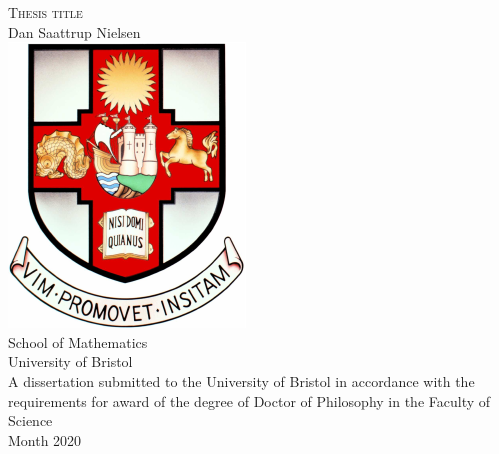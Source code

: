 \documentclass[../main]{subfiles}
\begin{document}
\begin{titlepage}
  \begin{center}
	  \vspace*{0.5cm}
    {\Huge\textsc{Thesis title}}\\[0.2cm]
    {\Large Dan Saattrup Nielsen}\\[3.0cm]
    \includegraphics[scale = 1.1]{gfx/bristolcrest.pdf}\\
	  \vspace*{0.5cm}
    {\Large School of Mathematics}\\[0.2cm]
    {\Large\sc University of Bristol}\\[0.6cm]
	  \vspace*{\fill}
    {\large A dissertation submitted to the University of Bristol in accordance with the requirements for award of the degree of Doctor of Philosophy in the Faculty of Science}\\[0.5cm]
    {\large\sc Month 2020}
  \end{center}
\end{titlepage}

\noindent
\pagestyle{fancy}
\fancyhead[L]{\nouppercase\leftmark}
\fancyhead[R]{\nouppercase\rightmark}
\setlength\headsep{35pt}

\thispagestyle{empty}
\end{document}
